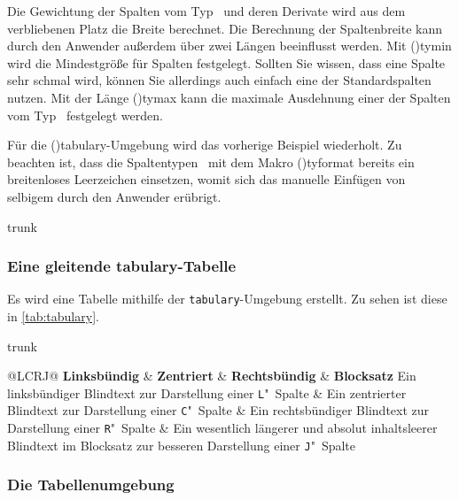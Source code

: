 \documentclass[%
  english,ngerman,%
  cdgeometry=no,DIV=12,%
  cd=false,cdfont=false,cdtitle=true,%
  headings=normal,%
  automark,%
  listof=toc,%
]{tudscrartcl}
\begin{document}
Die Gewichtung der Spalten vom Typ~ und deren Derivate wird aus 
dem verbliebenen Platz die Breite berechnet. Die Berechnung der Spaltenbreite 
kann durch den Anwender außerdem über zwei Längen beeinflusst werden. Mit 
\Length(){tymin} wird die Mindestgröße für Spalten 
festgelegt. Sollten Sie wissen, dass eine Spalte sehr schmal wird, können Sie 
allerdings auch einfach eine der Standardspalten~ nutzen. Mit der 
Länge \Length(){tymax} kann die maximale Ausdehnung einer der 
Spalten vom Typ~ festgelegt werden. 

Für die \Environment(){tabulary}-Umgebung wird das vorherige 
Beispiel wiederholt. Zu beachten ist, dass die Spaltentypen~ mit 
dem Makro \Macro(){tyformat} bereits ein breitenloses 
Leerzeichen einsetzen, womit sich das manuelle Einfügen von selbigem durch den 
Anwender erübrigt.
%
\begin{Code}[nolst]{trunk}
\subsubsection{Eine gleitende tabulary-Tabelle}

Es wird eine Tabelle mithilfe der \texttt{tabulary}-Umgebung erstellt. 
Zu sehen ist diese in \autoref{tab:tabulary}. 

\end{Code}
\begin{Code}[input]{trunk}
\begin{table}
\begin{tabulary}{\textwidth}{@{}LCRJ@{}}
\toprule
\textbf{Linksbündig} & \textbf{Zentriert} & 
\textbf{Rechtsbündig} & \textbf{Blocksatz} \tabularnewline\midrule
Ein linksbündiger Blindtext 
  zur Darstellung einer \texttt{L}"~Spalte &
Ein zentrierter Blindtext 
  zur Darstellung einer \texttt{C}"~Spalte &
Ein rechtsbündiger Blindtext 
  zur Darstellung einer \texttt{R}"~Spalte &
Ein wesentlich längerer und absolut inhaltsleerer Blindtext im Blocksatz 
  zur besseren Darstellung einer \texttt{J}"~Spalte
\tabularnewline\bottomrule
\end{tabulary}
\caption{Eine \texttt{tabulary}-Tabelle\label{tab:tabulary}}
\end{table}

\end{Code}



\subsubsection{%
  Die Tabellenumgebung %
  \label{sec:tabu}%
}
\end{document}
